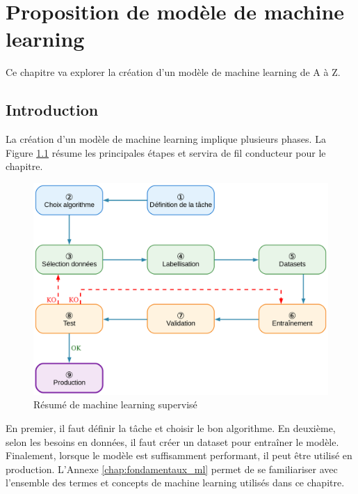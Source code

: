 \chapter{Proposition de modèle de machine learning}
\label{chap:proposition_modele}

Ce chapitre va explorer la création d'un modèle de machine learning de A à Z.

\localtableofcontents

\newpage

\section{Introduction}
La création d'un modèle de machine learning implique plusieurs phases. La Figure \ref{fig:ch3_resume_machine_learning_supervise} résume les principales étapes et servira de fil conducteur pour le chapitre.
\begin{figure}[H]
    \centering
    \includegraphics[width=1\linewidth]{03-tail/A1_fondamentaux_ML/A1_figures/A1_01_resume_machine_learning_supervise.png}
    \caption{Résumé de machine learning supervisé}
    \label{fig:ch3_resume_machine_learning_supervise}
\end{figure}
En premier, il faut définir la tâche et choisir le bon algorithme. En deuxième, selon les besoins en données, il faut créer un dataset pour entraîner le modèle. Finalement, lorsque le modèle est suffisamment performant, il peut être utilisé en production. L'Annexe \ref{chap:fondamentaux_ml} permet de se familiariser avec l'ensemble des termes et concepts de machine learning utilisés dans ce chapitre.

